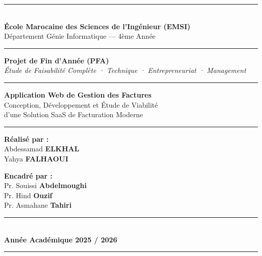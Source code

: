 \documentclass[12pt,a4paper]{report}
\begin{document}
\begin{titlepage}
\begin{flushleft}
\end{flushleft}

\vspace{-1cm}
\centering
\rule{\linewidth}{1.5pt}\\[0.3cm]
{\large\textbf{École Marocaine des Sciences de l'Ingénieur (EMSI)}}\\
{\normalsize Département Génie Informatique — 4ème Année}\\
\rule{\linewidth}{0.5pt}

\vspace{1.2cm}

{\LARGE\bfseries Projet de Fin d'Année (PFA)}\\[0.5cm]
{\small\textit{Étude de Faisabilité Complète · Technique · Entrepreneuriat · Management}}

\vspace{1cm}
\rule{0.6\linewidth}{0.8pt}

\vspace{0.8cm}
{\Huge\bfseries\color{emsiblue} Application Web de Gestion des Factures}\\[0.4cm]
{\Large Conception, Développement et Étude de Viabilité\\d'une Solution SaaS de Facturation Moderne}

\vspace{0.8cm}
\rule{0.6\linewidth}{0.8pt}

\vspace{1.2cm}

\begin{minipage}{0.45\textwidth}
\centering
{\large\textbf{Réalisé par :}}\\[0.3cm]
{\large Abdessamad \textbf{ELKHAL}}\\
{\large Yahya \textbf{FALHAOUI}}
\end{minipage}
\hfill
\begin{minipage}{0.45\textwidth}
\centering
{\large\textbf{Encadré par :}}\\[0.3cm]
{\normalsize Pr. Souissi \textbf{Abdelmoughi}}\\
{\normalsize Pr. Hind \textbf{Ouzif}}\\
{\normalsize Pr. Asmahane \textbf{Tahiri}}
\end{minipage}

\vfill

\rule{\linewidth}{0.5pt}\\[0.2cm]
{\large\textbf{Année Académique 2025 / 2026}}\\
\rule{\linewidth}{1pt}

\end{titlepage}
\end{document}
